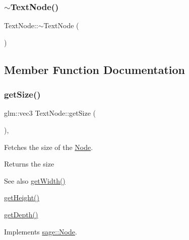 \mbox{\label{classsage_1_1TextNode_a3ad8241316536959f2727a0abb8dc3e7}} 
\subsubsection{\texorpdfstring{$\sim$TextNode()}{~TextNode()}}
{\footnotesize\ttfamily Text\+Node\+::$\sim$\+Text\+Node (\begin{DoxyParamCaption}{ }\end{DoxyParamCaption})}



\subsection{Member Function Documentation}
\mbox{\label{classsage_1_1TextNode_acdfcc350ceb004d934ab731ad9d1e176}} 
\subsubsection{\texorpdfstring{getSize()}{getSize()}}
{\footnotesize\ttfamily glm\+::vec3 Text\+Node\+::get\+Size (\begin{DoxyParamCaption}{ }\end{DoxyParamCaption})\hspace{0.3cm}{\ttfamily [override]}, {\ttfamily [virtual]}}



Fetches the size of the \mbox{\hyperlink{classsage_1_1Node}{Node}}. 

\begin{DoxyReturn}{Returns}
the size 
\end{DoxyReturn}
\begin{DoxySeeAlso}{See also}
\mbox{\hyperlink{classsage_1_1Node_a65163ffabcfe9f482282ea37ead6fc5f}{get\+Width()}} 

\mbox{\hyperlink{classsage_1_1Node_a6af5a8378ac8d2c3490adbc2a03f1247}{get\+Height()}} 

\mbox{\hyperlink{classsage_1_1Node_a5c4c28939c7adf7e4a65dbb02c0cbcd3}{get\+Depth()}} 
\end{DoxySeeAlso}


Implements \mbox{\hyperlink{classsage_1_1Node_ad14a04d08b5261c27d3080f6a5e12836}{sage\+::\+Node}}.

